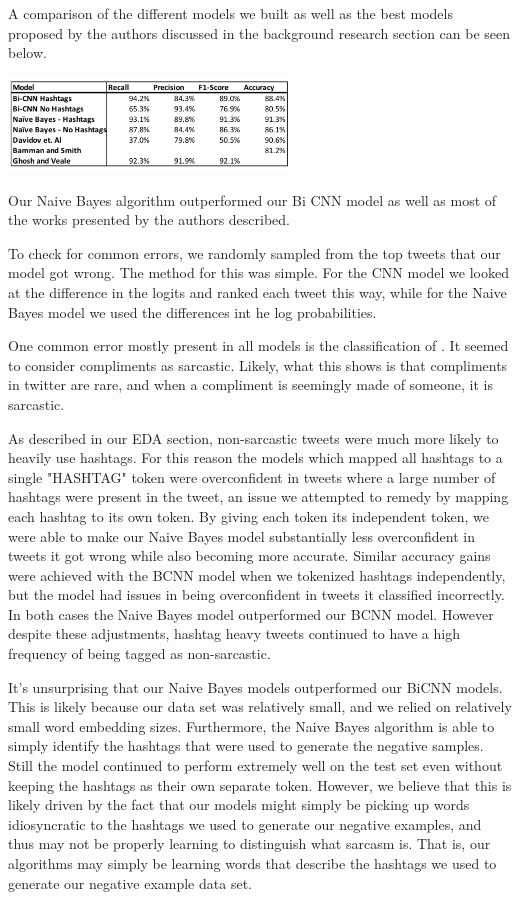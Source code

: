\documentclass[11pt,a4paper]{article}
\begin{document}
A comparison of the different models we built as well as the best models proposed by the authors discussed in the background research section can be seen below.

\includegraphics[width=75mm,scale=0.5]{results.png}

Our Naive Bayes algorithm outperformed our Bi CNN model as well as most of the works presented by the authors described.

To check for common errors, we randomly sampled from the top  tweets that our model got wrong. The method for this was simple. For the CNN model we looked at the difference in the logits and ranked each tweet this way, while for the Naive Bayes model we used the differences int he log probabilities. 

One common error mostly present in all models is the classification of . It seemed to consider compliments as sarcastic. Likely, what this shows is that compliments in twitter are rare, and when a compliment is seemingly made of someone, it is sarcastic. 

As described in our EDA section, non-sarcastic tweets were much more likely to heavily use hashtags. For this reason the models which mapped all hashtags to a single "HASHTAG" token were overconfident in tweets where a large number of hashtags were present in the tweet, an issue we attempted to remedy by mapping each hashtag to its own token. By giving each token its independent token, we were able to make our Naive Bayes model substantially less overconfident in tweets it got wrong while also becoming more accurate. Similar accuracy gains were achieved with the BCNN model when we tokenized hashtags independently, but the model had issues in being overconfident in tweets it classified incorrectly. In both cases the Naive Bayes model outperformed our BCNN model. However despite these adjustments, hashtag heavy tweets continued to have a high frequency of being tagged as non-sarcastic.

It's unsurprising that our Naive Bayes models outperformed our BiCNN models. This is likely because our data set was relatively small, and we relied on relatively small word embedding sizes. Furthermore, the Naive Bayes algorithm is able to simply identify the hashtags that were used to generate the negative samples. Still the model continued to perform extremely well on the test set even without keeping the hashtags as their own separate token. However, we believe that this is likely driven by the fact that our models might simply be picking up words idiosyncratic to the hashtags we used to generate our negative examples, and thus may not be properly learning to distinguish what sarcasm is. That is, our algorithms may simply be learning words that describe the hashtags we used to generate our negative example data set. 
\end{document}
